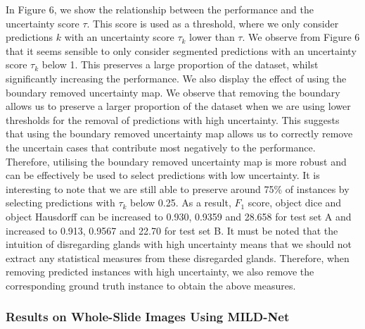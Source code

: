 \documentclass[3p]{elsarticle}
\begin{document}
In Figure 6, we show the relationship between the performance and the uncertainty score $\tau$. This score is used as a threshold, where we only consider predictions $k$ with an uncertainty score $\tau_k$ lower than $\tau$. We observe from Figure 6 that it seems sensible to only consider segmented predictions with an uncertainty score $\tau_k$ below 1. This preserves a large proportion of the dataset, whilst significantly increasing the performance. We also display the effect of using the boundary removed uncertainty map. We observe that removing the boundary allows us to preserve a larger proportion of the dataset when we are using lower thresholds for the removal of predictions with high uncertainty. This suggests that using the boundary removed uncertainty map allows us to correctly remove the uncertain cases that contribute most negatively to the performance. Therefore, utilising the boundary removed uncertainty map is more robust and can be effectively be used to select predictions with low uncertainty. It is interesting to note that we are still able to preserve around 75\% of instances by selecting predictions with $\tau_k$ below 0.25. As a result, $F_1$ score, object dice and object Hausdorff can be increased to 0.930, 0.9359 and 28.658 for test set A and increased to 0.913, 0.9567 and 22.70 for test set B. It must be noted that the intuition of disregarding glands with high uncertainty means that we should not extract any statistical measures from these disregarded glands. Therefore, when removing predicted instances with high uncertainty, we also remove the corresponding ground truth instance to obtain the above measures. 

\subsubsection{Results on Whole-Slide Images Using MILD-Net}
\end{document}
